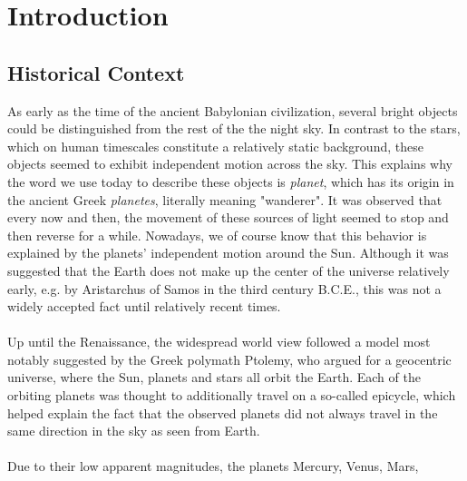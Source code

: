 \chapter{Introduction}

  \setcounter{page}{1} %

  \section{Historical Context}

    As early as the time of the ancient Babylonian civilization, several 
    bright objects could be distinguished from the rest of the the night sky. 
    In contrast to the stars, which on human timescales constitute a relatively
    static background, these objects seemed to exhibit independent motion 
    across 
    the sky. This explains why the word we use today to describe these objects 
    is \textit{planet}, which has its origin in the ancient Greek 
    \textit{planetes}, literally meaning "wanderer".
    It was observed that every now and then, the movement of these sources of 
    light seemed to stop and then reverse for a while. Nowadays, we of course 
    know that this behavior is explained by the planets' 
    independent motion around the Sun. Although it was suggested that the Earth 
    does not make up the center of the universe relatively early, e.g. by
    Aristarchus of Samos in the third century B.C.E., 
    this was not a widely accepted fact until relatively recent times. \\
    \\
%
%
%
    Up until the Renaissance, the widespread world view followed a model most 
    notably suggested by the Greek polymath Ptolemy, who argued for a geocentric 
    universe, where the Sun, planets and stars all orbit the Earth. Each of 
    the orbiting planets was thought to additionally travel on a so-called 
    epicycle, which helped explain the fact that the observed planets did not 
    always travel in the same direction in the sky as seen from Earth. \\
    \\
    Due to their low apparent magnitudes, the planets Mercury, Venus, Mars, 
